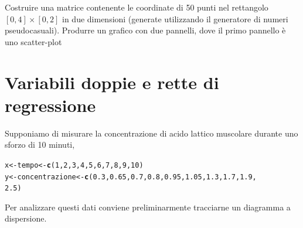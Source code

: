 \documentclass[onecolumn,12pt]{book}\usepackage[]{graphicx}\usepackage[]{color}
\makeatletter
\newcommand{\hlnum}[1]{\textcolor[rgb]{0.686,0.059,0.569}{#1}}%
\newcommand{\hlstd}[1]{\textcolor[rgb]{0.345,0.345,0.345}{#1}}%
\newcommand{\hlkwb}[1]{\textcolor[rgb]{0.69,0.353,0.396}{#1}}%
\newcommand{\hlkwd}[1]{\textcolor[rgb]{0.737,0.353,0.396}{\textbf{#1}}}%
\newenvironment{kframe}{%
 \def\at@end@of@kframe{}%
 \ifinner\ifhmode%
  \def\at@end@of@kframe{\end{minipage}}%
  \begin{minipage}{\columnwidth}%
 \fi\fi%
 \def\FrameCommand##1{\hskip\@totalleftmargin \hskip-\fboxsep
 \colorbox{shadecolor}{##1}\hskip-\fboxsep
     \hskip-\linewidth \hskip-\@totalleftmargin \hskip\columnwidth}%
 \MakeFramed {\advance\hsize-\width
   \@totalleftmargin\z@ \linewidth\hsize
   \@setminipage}}%
 {\par\unskip\endMakeFramed%
 \at@end@of@kframe}
\newenvironment{knitrout}{}{} %
\makeatother
\begin{document}
\begin{shaded}{Costruire una matrice contenente le coordinate di 50 punti nel rettangolo $[0,4]\times [0,2]$ in due dimensioni (generate utilizzando il generatore di numeri pseudocasuali). Produrre un grafico con due pannelli, dove il primo pannello \`e uno scatter-plot}
\end{shaded}
\section{Variabili doppie e rette di regressione}
Supponiamo di misurare la concentrazione di acido lattico muscolare durante uno sforzo di 10 minuti,
\begin{knitrout}
\color{fgcolor}\begin{kframe}
\begin{alltt}
\hlstd{x}\hlkwb{<-}\hlstd{tempo}\hlkwb{<-}\hlkwd{c}\hlstd{(}\hlnum{1}\hlstd{,}\hlnum{2}\hlstd{,}\hlnum{3}\hlstd{,}\hlnum{4}\hlstd{,}\hlnum{5}\hlstd{,}\hlnum{6}\hlstd{,}\hlnum{7}\hlstd{,}\hlnum{8}\hlstd{,}\hlnum{9}\hlstd{,}\hlnum{10}\hlstd{)}
\hlstd{y}\hlkwb{<-}\hlstd{concentrazione}\hlkwb{<-}\hlkwd{c}\hlstd{(}\hlnum{0.3}\hlstd{,}\hlnum{0.65}\hlstd{,}\hlnum{0.7}\hlstd{,}\hlnum{0.8}\hlstd{,}\hlnum{0.95}\hlstd{,}\hlnum{1.05}\hlstd{,}\hlnum{1.3}\hlstd{,}\hlnum{1.7}\hlstd{,}\hlnum{1.9}\hlstd{,}
\hlnum{2.5}\hlstd{)}
\end{alltt}
\end{kframe}
\end{knitrout}
Per analizzare questi dati conviene preliminarmente tracciarne un diagramma a dispersione.
\end{document}

